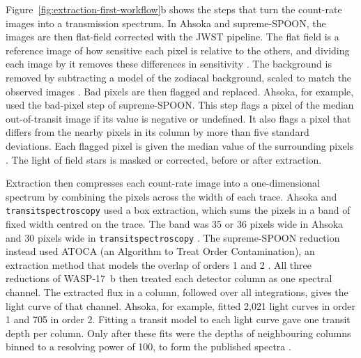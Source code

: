 Figure~\ref{fig:extraction-first-workflow}b shows the steps that turn the
count-rate images into a transmission spectrum. In Ahsoka and supreme-SPOON, the images are then flat-field corrected with the JWST pipeline. The flat field is a reference image of how sensitive
each pixel is relative to the others, and dividing each image by it removes
these differences in sensitivity \citep{JWSTPipeline2025,LouieEtAl2025}. The
background is removed by subtracting a model of the zodiacal background,
scaled to match the observed images \citep{LouieEtAl2025}. Bad pixels are
then flagged and replaced. 
Ahsoka, for example, used the bad-pixel step of supreme-SPOON. This step
flags a pixel of the median out-of-transit image if its value is negative or
undefined. It also flags a pixel that differs from the nearby pixels in its
column by more than five standard deviations. Each flagged pixel is given the
median value of the surrounding pixels \citep{LouieEtAl2025}. The light of
field stars is masked or corrected, before or after extraction.

Extraction then compresses each count-rate image into a one-dimensional
spectrum by combining the pixels across the width of each trace. Ahsoka and
\texttt{transitspectroscopy} used a box extraction, which sums the pixels in a
band of fixed width centred on the trace. The band was 35 or 36 pixels wide in
Ahsoka and 30 pixels wide in \texttt{transitspectroscopy}
\citep{LouieEtAl2025}. The supreme-SPOON reduction instead used ATOCA (an
Algorithm to Treat Order Contamination), an extraction method that models the
overlap of orders 1 and 2 \citep{DarveauBernierEtAl2022,LouieEtAl2025}. All
three reductions of WASP-17~b then treated each detector column as one
spectral channel. The extracted flux in a column, followed over all
integrations, gives the light curve of that channel. Ahsoka, for example,
fitted 2,021 light curves in order 1 and 705 in order 2. Fitting a transit
model to each light curve gave one transit depth per column. Only after these
fits were the depths of neighbouring columns binned to a resolving power of
100, to form the published spectra \citep{LouieEtAl2025}.

